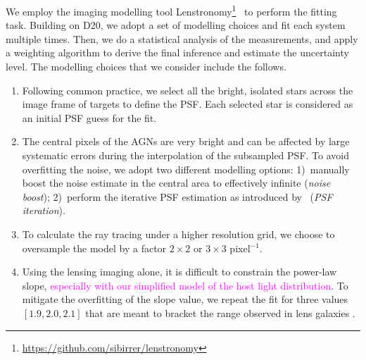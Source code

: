 \documentclass[fleqn,usenatbib]{mnras}
\newcommand{\lenstronomy}{{\sc Lenstronomy}}
\newcommand{\pink}[1]{{\textcolor{magenta}{#1}}}
\begin{document}
We employ the imaging modelling tool \lenstronomy\footnote{\url{https://github.com/sibirrer/lenstronomy}}~\citep{lenstronomy} to perform the fitting task. Building on D20, we adopt a set of  modelling choices and fit each system multiple times. Then, we do a statistical analysis of the measurements, and apply a weighting algorithm to derive the final inference and estimate the uncertainty level. The modelling choices that we consider include the follows.
\begin{enumerate}
\item Following common practice, we select all the bright, isolated stars across the image frame of targets to define the PSF. Each selected star is considered as an initial PSF guess for the fit.
\item The central pixels of the AGNs are very bright and can be affected by large systematic errors during the interpolation of the subsampled PSF. To avoid overfitting the noise, we adopt two different modelling options: 1)~manually boost the noise estimate in the central area to effectively infinite ({\it noise boost}); 2)~perform the iterative PSF estimation as introduced by~\citet{Chen2016, Birrer2019} ({\it PSF iteration}).
\item To calculate the ray tracing under a higher resolution grid, we choose to oversample the model by a factor  $2\times2$ or $3\times3$ pixel$^{-1}$.
\item Using the lensing imaging alone, it is difficult to constrain the power-law slope, \pink{especially with our simplified model of the host light distribution}. To mitigate the overfitting of the slope value, we repeat the fit for three values $[1.9, 2.0, 2.1]$ that are meant to bracket the range observed in lens galaxies \citep[e.g.,][]{Auger2010}.
\end{enumerate}
\end{document}

